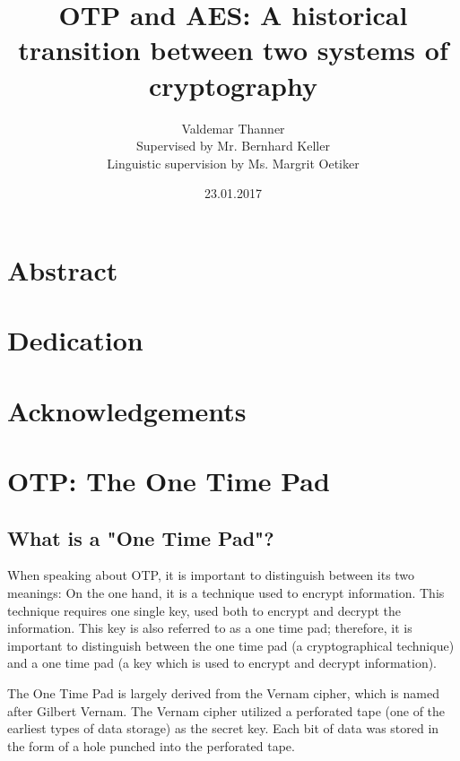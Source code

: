 \documentclass[12pt]{report}
\theoremstyle{definition}
\theoremstyle{remark}
\begin{document}
\title{OTP and AES: A historical transition between two systems of cryptography}
\author{Valdemar Thanner\\Supervised by Mr. Bernhard Keller\\Linguistic supervision by Ms. Margrit Oetiker}
\date{23.01.2017}
\maketitle

\chapter*{Abstract}

\chapter*{Dedication}

\chapter*{Acknowledgements}

\tableofcontents

\chapter{OTP: The One Time Pad}

\section{What is a "One Time Pad"?}
When speaking about OTP, it is important to distinguish between its two meanings: On the one hand, it is a technique used to encrypt information. This technique requires one single key, used both to encrypt and decrypt the information. This key is also referred to as a one time pad; therefore, it is important to distinguish between the one time pad (a cryptographical technique) and a one time pad (a key which is used to encrypt and decrypt information).

The One Time Pad is largely derived from the Vernam cipher, which is named after Gilbert Vernam. The Vernam cipher utilized a perforated tape (one of the earliest types of data storage) as the secret key\cite{VernamPatent}. Each bit of data was stored in the form of a hole punched into the perforated tape.
\end{document}
